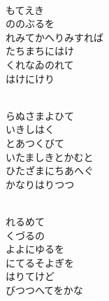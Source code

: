 \documentclass[10pt,b5j]{tarticle} %
\begin{document}
\begin{enumerate}
\begin{minipage}[c]{\blocksize}
        \vspace{\linespace}
        \item~\\
        もてえき\\
        ののぶるを\\
        れみてかへりみすれば\\
        たちまちにはけ\\
        くれなゐのれて\\
        はけにけり
        
        \vspace{\linespace}
        \item~\\
        らぬさまよひて\\
        いきしはく\\
        とあつくびて\\
        いたましきとかむと\\
        ひたざまにちあへぐ\\
        かなりはりつつ
        
        \vspace{\linespace}
        \item~\\
        れるめて\\
        くづるの\\
        よよにゆるを\\
        にてるそよぎを\\
        はりてけど\\
        びつつへてをかな
    
    \end{minipage}
\end{enumerate} %
\end{document}
